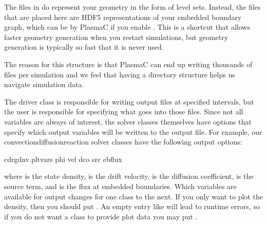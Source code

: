 \documentclass[letterpaper,10pt,english]{sphinxmanual}
\begin{document}
The files in  do  represent your geometry in the form of level sets. Instead, the files that are placed here are HDF5 representations of your embedded boundary graph, which can be  by PlasmaC if you enable . This is a shortcut that allows faster geometry generation when you restart simulations, but geometry generation is typically so fast that it is never used.

The reason for this structure is that PlasmaC can end up writing thousands of files per simulation and we feel that having a directory structure helps us navigate simulation data.

The driver class {\hyperref[\detokenize{Driver:chap-driver}]{}} is responsible for writing output files at specified intervals, but the user is responsible for specifying what goes into those files. Since not all variables are always of interest, the solver classes themselves have options  that specify which output variables will be written to the output file. For example, our convection\sphinxhyphen{}diffusion\sphinxhyphen{}reaction solver classes have the following output options:

\begin{sphinxVerbatim}[commandchars=\\\{\},formatcom=\scriptsize]
cdr\PYGZus{}gdnv.plt\PYGZus{}vars  phi vel dco src ebflux 
\end{sphinxVerbatim}

where  is the state density,  is the drift velocity,  is the diffusion coefficient,  is the source term, and  is the flux at embedded boundaries. Which variables are available for output changes for one class to the next. If you only want to plot the density, then you should put . An empty entry like  will lead to run\sphinxhyphen{}time errors, so if you do not want a class to provide plot data you may put .
\end{document}
